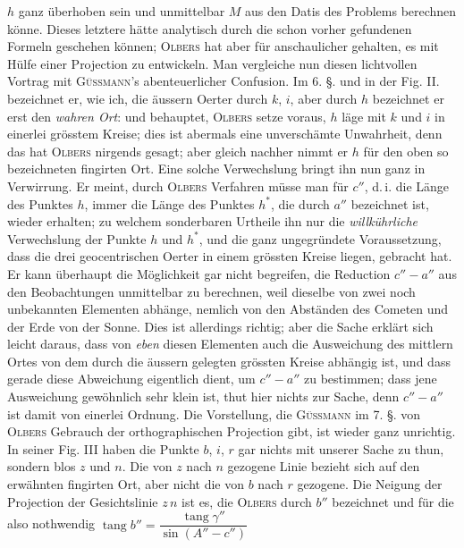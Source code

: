 \noindent $h$ ganz überhoben sein und unmittelbar $M$ aus den Datis des Problems berechnen könne. Dieses letztere hätte analytisch durch die schon vorher gefundenen Formeln geschehen können; \textsc{Olbers} hat aber für anschaulicher gehalten, es mit Hülfe einer Projection zu entwickeln. Man vergleiche nun diesen lichtvollen Vortrag mit \textsc{Güssmann}'s abenteuerlicher Confusion. Im 6. §. und in der Fig. II. bezeichnet er, wie ich, die äussern Oerter durch $k$, $i$, aber durch $h$ bezeichnet er erst den \emph{wahren Ort}: und behauptet, \textsc{Olbers} setze voraus, $h$ läge mit $k$ und $i$ in einerlei grösstem Kreise; dies ist abermals eine unverschämte Unwahrheit, denn das hat \textsc{Olbers} nirgends gesagt; aber gleich nachher nimmt er $h$ für den oben so bezeichneten fingirten Ort. Eine solche Verwechslung bringt ihn nun ganz in Verwirrung. Er meint, durch \textsc{Olbers} Verfahren müsse man für $c''$, d.\,i. die Länge des Punktes $h$, immer die Länge des Punktes $h^*$, die durch $a''$ bezeichnet ist, wieder erhalten; zu welchem sonderbaren Urtheile ihn nur die \emph{willkührliche} Verwechslung der Punkte $h$ und $h^*$, und die ganz ungegründete Voraussetzung, dass die drei geocentrischen Oerter in einem grössten Kreise liegen, gebracht hat. Er kann überhaupt die Möglichkeit gar nicht begreifen, die Reduction $c''-a''$ aus den Beobachtungen unmittelbar zu berechnen, weil dieselbe von zwei noch unbekannten Elementen abhänge, nemlich von den Abständen des Cometen und der Erde von der Sonne. Dies ist allerdings richtig; aber die Sache erklärt sich leicht daraus, dass von \emph{eben} diesen Elementen auch die Ausweichung des mittlern Ortes von dem durch die äussern gelegten grössten Kreise abhängig ist, und dass gerade diese Abweichung eigentlich dient, um $c''-a''$ zu bestimmen; dass jene Ausweichung gewöhnlich sehr klein ist, thut hier nichts zur Sache, denn $c''-a''$ ist damit von einerlei Ordnung. Die Vorstellung, die \textsc{Güssmann} im 7. §. von \textsc{Olbers} Gebrauch der orthographischen Projection gibt, ist wieder ganz unrichtig. In seiner Fig. III haben die Punkte $b$, $i$, $r$ gar nichts mit unserer Sache zu thun, sondern blos $z$ und $n$. Die von $z$ nach $n$ gezogene Linie bezieht sich auf den erwähnten fingirten Ort, aber nicht die von $b$ nach $r$ gezogene. Die Neigung der Projection der Gesichtslinie $z\,n$ ist es, die \textsc{Olbers} durch $b''$ bezeichnet und für die also nothwendig
$\operatorname{tang} b'' = \dfrac{\operatorname{tang} \gamma''}{\sin(A''-c'')}$
